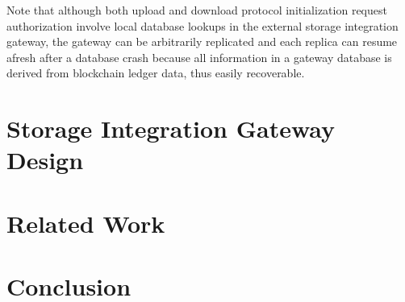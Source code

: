 \documentclass[conference]{IEEEtran}
\begin{document}
Note that although both upload and download protocol initialization request authorization involve local database lookups in the external storage integration gateway, the gateway can be arbitrarily replicated and each replica can resume afresh after a database crash because all information in a gateway database is derived from blockchain ledger data, thus easily recoverable.          
             
\section{Storage Integration Gateway Design}
\label{s-gate}

\section{Related Work}
\label{s-rw}

\section{Conclusion}
\label{s-con}
 


\end{document}
